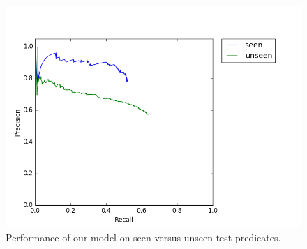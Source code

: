 \begin{figure}[tb!]

  \centering
    \includegraphics[width=1\columnwidth]{figures/uniq_test_pr}

  \caption{Performance of our model on seen versus unseen test predicates.}
  \label{fig:unseen}

\end{figure}


